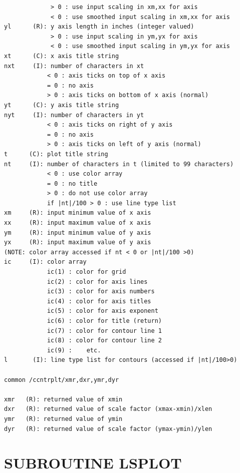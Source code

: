 \documentclass[11pt]{report}
\begin{document}
\begin{verbatim}
             > 0 : use input scaling in xm,xx for axis
             < 0 : use smoothed input scaling in xm,xx for axis
yl      (R): y axis length in inches (integer valued)
             > 0 : use input scaling in ym,yx for axis
             < 0 : use smoothed input scaling in ym,yx for axis
xt      (C): x axis title string
nxt     (I): number of characters in xt
            < 0 : axis ticks on top of x axis
            = 0 : no axis
            > 0 : axis ticks on bottom of x axis (normal)
yt      (C): y axis title string
nyt     (I): number of characters in yt
            < 0 : axis ticks on right of y axis
            = 0 : no axis
            > 0 : axis ticks on left of y axis (normal)
t      (C): plot title string
nt     (I): number of characters in t (limited to 99 characters)
            < 0 : use color array
            = 0 : no title
            > 0 : do not use color array
            if |nt|/100 > 0 : use line type list
xm     (R): input minimum value of x axis
xx     (R): input maximum value of x axis
ym     (R): input minimum value of y axis
yx     (R): input maximum value of y axis
(NOTE: color array accessed if nt < 0 or |nt|/100 >0)
ic     (I): color array
            ic(1) : color for grid
            ic(2) : color for axis lines
            ic(3) : color for axis numbers
            ic(4) : color for axis titles
            ic(5) : color for axis exponent
            ic(6) : color for title (return)
            ic(7) : color for contour line 1
            ic(8) : color for contour line 2
            ic(9) :    etc.
l       (I): line type list for contours (accessed if |nt|/100>0)

common /ccntrplt/xmr,dxr,ymr,dyr

xmr   (R): returned value of xmin
dxr   (R): returned value of scale factor (xmax-xmin)/xlen
ymr   (R): returned value of ymin
dyr   (R): returned value of scale factor (ymax-ymin)/ylen
\end{verbatim}

\newpage
\section{SUBROUTINE LSPLOT}
\end{document}
